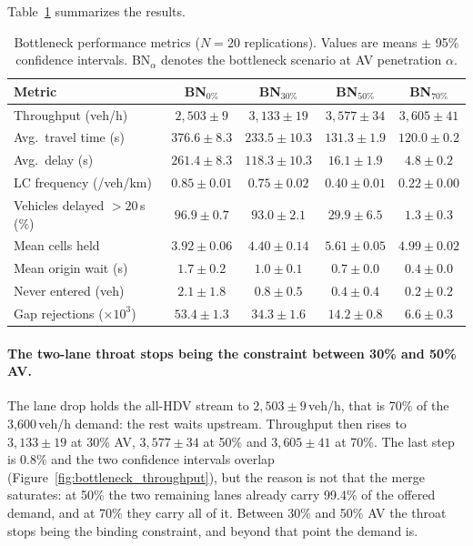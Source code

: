 \documentclass[review,number]{elsarticle}
\begin{document}
Table~\ref{tab:results_bottleneck} summarizes the results.

\begin{table}[ht]
\centering
\caption{Bottleneck performance metrics ($N = 20$ replications). Values are means $\pm$ 95\% confidence intervals. BN$_\alpha$ denotes the bottleneck scenario at AV penetration $\alpha$.}
\label{tab:results_bottleneck}
\begin{tabular}{@{}lcccc@{}}
\toprule
Metric & BN$_{0\%}$ & BN$_{30\%}$ & BN$_{50\%}$ & BN$_{70\%}$ \\
\midrule
Throughput (veh/h) & $2{,}503 \pm 9$ & $3{,}133 \pm 19$ & $3{,}577 \pm 34$ & $3{,}605 \pm 41$ \\
Avg.\ travel time (s) & $376.6 \pm 8.3$ & $233.5 \pm 10.3$ & $131.3 \pm 1.9$ & $120.0 \pm 0.2$ \\
Avg.\ delay (s) & $261.4 \pm 8.3$ & $118.3 \pm 10.3$ & $16.1 \pm 1.9$ & $4.8 \pm 0.2$ \\
LC frequency (/veh/km) & $0.85 \pm 0.01$ & $0.75 \pm 0.02$ & $0.40 \pm 0.01$ & $0.22 \pm 0.00$ \\
Vehicles delayed $>20$\,s (\%) & $96.9 \pm 0.7$ & $93.0 \pm 2.1$ & $29.9 \pm 6.5$ & $1.3 \pm 0.3$ \\
Mean cells held & $3.92 \pm 0.06$ & $4.40 \pm 0.14$ & $5.61 \pm 0.05$ & $4.99 \pm 0.02$ \\
Mean origin wait (s) & $1.7 \pm 0.2$ & $1.0 \pm 0.1$ & $0.7 \pm 0.0$ & $0.4 \pm 0.0$ \\
Never entered (veh) & $2.1 \pm 1.8$ & $0.8 \pm 0.5$ & $0.4 \pm 0.4$ & $0.2 \pm 0.2$ \\
Gap rejections ($\times 10^3$) & $53.4 \pm 1.3$ & $34.3 \pm 1.6$ & $14.2 \pm 0.8$ & $6.6 \pm 0.3$ \\
\bottomrule
\end{tabular}
\end{table}

\paragraph{The two-lane throat stops being the constraint between 30\% and 50\% AV.}
The lane drop holds the all-HDV stream to $2{,}503 \pm 9$\,veh/h, that is 70\% of the 3{,}600\,veh/h demand: the rest waits upstream. Throughput then rises to $3{,}133 \pm 19$ at 30\% AV, $3{,}577 \pm 34$ at 50\% and $3{,}605 \pm 41$ at 70\%. The last step is 0.8\% and the two confidence intervals overlap (Figure~\ref{fig:bottleneck_throughput}), but the reason is not that the merge saturates: at 50\% the two remaining lanes already carry 99.4\% of the offered demand, and at 70\% they carry all of it. Between 30\% and 50\% AV the throat stops being the binding constraint, and beyond that point the demand is.
\end{document}
